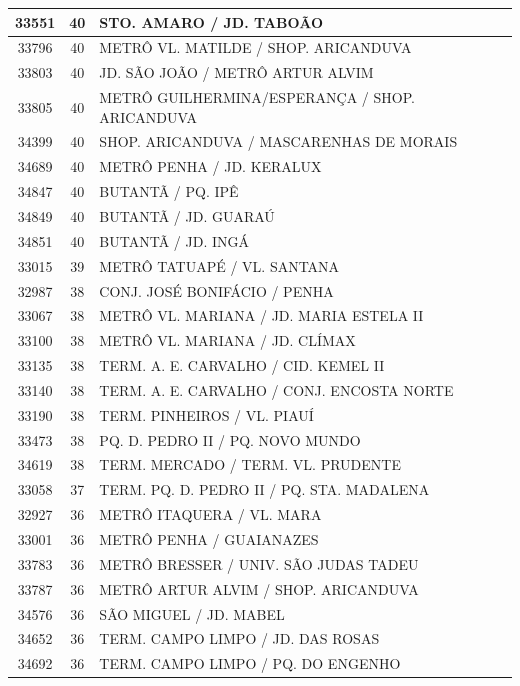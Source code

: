 \documentclass[
	12pt,				%
	oneside,			%
	a4paper,			%
	english,			%
	brazil				%
	]{abntex2ppgsi}
\begin{document}
\begin{apendicesenv}
\begin{longtable}{c|c|p{7cm}}
\hline
    33551 & 40    & STO. AMARO / JD. TABOÃO \\
\hline
    33796 & 40    & METRÔ VL. MATILDE / SHOP. ARICANDUVA \\
\hline
    33803 & 40    & JD. SÃO JOÃO / METRÔ ARTUR ALVIM \\
\hline
    33805 & 40    & METRÔ GUILHERMINA/ESPERANÇA / SHOP. ARICANDUVA \\
\hline
    34399 & 40    & SHOP. ARICANDUVA / MASCARENHAS DE MORAIS \\
\hline
    34689 & 40    & METRÔ PENHA / JD. KERALUX \\
\hline
    34847 & 40    & BUTANTÃ / PQ. IPÊ \\
\hline
    34849 & 40    & BUTANTÃ / JD. GUARAÚ \\
\hline
    34851 & 40    & BUTANTÃ / JD. INGÁ \\
\hline
    33015 & 39    & METRÔ TATUAPÉ / VL. SANTANA \\
\hline
    32987 & 38    & CONJ. JOSÉ BONIFÁCIO / PENHA \\
\hline
    33067 & 38    & METRÔ VL. MARIANA / JD. MARIA ESTELA II \\
\hline
    33100 & 38    & METRÔ VL. MARIANA / JD. CLÍMAX \\
\hline
    33135 & 38    & TERM. A. E. CARVALHO / CID. KEMEL II \\
\hline
    33140 & 38    & TERM. A. E. CARVALHO / CONJ. ENCOSTA NORTE \\
\hline
    33190 & 38    & TERM. PINHEIROS / VL. PIAUÍ \\
\hline
    33473 & 38    & PQ. D. PEDRO II / PQ. NOVO MUNDO \\
\hline
    34619 & 38    & TERM. MERCADO / TERM. VL. PRUDENTE \\
\hline
    33058 & 37    & TERM. PQ. D. PEDRO II / PQ. STA. MADALENA \\
\hline
    32927 & 36    & METRÔ ITAQUERA / VL. MARA \\
\hline
    33001 & 36    & METRÔ PENHA / GUAIANAZES \\
\hline
    33783 & 36    & METRÔ BRESSER / UNIV. SÃO JUDAS TADEU \\
\hline
    33787 & 36    & METRÔ ARTUR ALVIM / SHOP. ARICANDUVA \\
\hline
    34576 & 36    & SÃO MIGUEL / JD. MABEL \\
\hline
    34652 & 36    & TERM. CAMPO LIMPO / JD. DAS ROSAS \\
\hline
    34692 & 36    & TERM. CAMPO LIMPO / PQ. DO ENGENHO \\

\end{longtable}
\end{apendicesenv}
\end{document}
